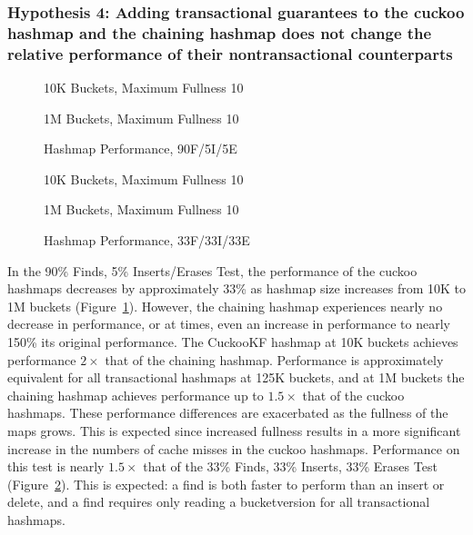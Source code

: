 \subsubsection{Hypothesis 4: Adding transactional guarantees to the cuckoo hashmap and the chaining hashmap does not change the relative performance of their nontransactional counterparts}

\begin{figure}[H]
    \centering
    \begin{minipage}{0.75\textwidth}
        \caption*{10K Buckets, Maximum Fullness 10}
        \vspace{12pt}
    \end{minipage}
    \begin{minipage}{0.75\textwidth}
        \caption*{1M Buckets, Maximum Fullness 10}
    \end{minipage}
	\caption{Hashmap Performance, 90F/5I/5E}
	\label{fig:hm_90}
\end{figure}

\begin{figure}[H]
    \centering
    \begin{minipage}{0.75\textwidth}
        \caption*{10K Buckets, Maximum Fullness 10}
        \vspace{12pt}
    \end{minipage}
    \begin{minipage}{0.75\textwidth}
        \caption*{1M Buckets, Maximum Fullness 10}
    \end{minipage}
	\caption{Hashmap Performance, 33F/33I/33E}
	\label{fig:hm_33}
\end{figure}

In the 90\% Finds, 5\% Inserts/Erases Test, the performance of the cuckoo hashmaps decreases by approximately 33\% as hashmap size increases from 10K to 1M buckets (Figure~\ref{fig:hm_90}). However, the chaining hashmap experiences nearly no decrease in performance, or at times, even an increase in performance to nearly 150\% its original performance. The CuckooKF hashmap at 10K buckets achieves performance $2\times$ that of the chaining hashmap. Performance is approximately equivalent for all transactional hashmaps at 125K buckets, and at 1M buckets the chaining hashmap achieves performance up to $1.5\times$ that of the cuckoo hashmaps. These performance differences are exacerbated as the fullness of the maps grows. This is expected since increased fullness results in a more significant increase in the numbers of cache misses in the cuckoo hashmaps.
 Performance on this test is nearly $1.5\times$ that of the 33\% Finds, 33\% Inserts, 33\% Erases Test (Figure~\ref{fig:hm_33}). This is expected: a find is both faster to perform than an insert or delete, and a find requires only reading a bucketversion for all transactional hashmaps.

